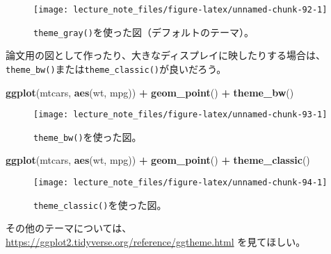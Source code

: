 \documentclass[]{book}
\newenvironment{Shaded}{\begin{snugshade}}{\end{snugshade}}
\newcommand{\KeywordTok}[1]{\textcolor[rgb]{0.13,0.29,0.53}{\textbf{#1}}}
\newcommand{\StringTok}[1]{\textcolor[rgb]{0.31,0.60,0.02}{#1}}
\newcommand{\OperatorTok}[1]{\textcolor[rgb]{0.81,0.36,0.00}{\textbf{#1}}}
\newcommand{\NormalTok}[1]{#1}
\begin{document}
\begin{figure}

{\centering \texttt{[image: lecture\_note\_files/figure-latex/unnamed-chunk-92-1]} 

}

\caption{\texttt{theme\_gray()}を使った図（デフォルトのテーマ）。}\label{fig:unnamed-chunk-92}
\end{figure}

論文用の図として作ったり、大きなディスプレイに映したりする場合は、\texttt{theme\_bw()}または\texttt{theme\_classic()}が良いだろう。



\begin{Shaded}
\begin{Highlighting}[]
\KeywordTok{ggplot}\NormalTok{(mtcars, }\KeywordTok{aes}\NormalTok{(wt, mpg)) }\OperatorTok{+}
\StringTok{  }\KeywordTok{geom_point}\NormalTok{() }\OperatorTok{+}
\StringTok{  }\KeywordTok{theme_bw}\NormalTok{()}
\end{Highlighting}
\end{Shaded}

\begin{figure}

{\centering \texttt{[image: lecture\_note\_files/figure-latex/unnamed-chunk-93-1]} 

}

\caption{\texttt{theme\_bw()}を使った図。}\label{fig:unnamed-chunk-93}
\end{figure}



\begin{Shaded}
\begin{Highlighting}[]
\KeywordTok{ggplot}\NormalTok{(mtcars, }\KeywordTok{aes}\NormalTok{(wt, mpg)) }\OperatorTok{+}
\StringTok{  }\KeywordTok{geom_point}\NormalTok{() }\OperatorTok{+}
\StringTok{  }\KeywordTok{theme_classic}\NormalTok{()}
\end{Highlighting}
\end{Shaded}

\begin{figure}

{\centering \texttt{[image: lecture\_note\_files/figure-latex/unnamed-chunk-94-1]} 

}

\caption{\texttt{theme\_classic()}を使った図。}\label{fig:unnamed-chunk-94}
\end{figure}

その他のテーマについては、\url{https://ggplot2.tidyverse.org/reference/ggtheme.html}
を見てほしい。
\end{document}
